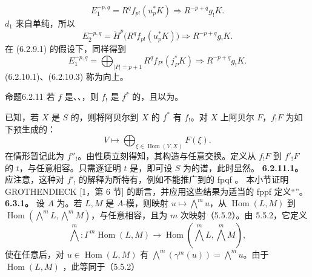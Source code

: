 \[E_1^{-p,q}=R^qf_{p!}(u_p^*K)\Longrightarrow R^{-p+q}g_!K.\tag{6.2.10.1}\]
 $d_1$ 来自单纯，所以
\[E_2^{-p,q}=\check H^p\bigl(R^qf_{p!}(u_p^*K)\bigr)\Longrightarrow R^{-p+q}g_!K.\tag{6.2.10.2}\]
在 (6.2.9.1) 的假设下，同样得到
\[E_1^{-p,q}=\bigoplus_{|P|=p+1}R^qf_{P!}(j_P^*K)\Longrightarrow R^{-p+q}g_!K.\tag{6.2.10.3}\]
 (6.2.10.1)、(6.2.10.3) 称为向上。
\begin{SGAresult}{命题}{6.2.11}
若 $f$ 是、、，则 $f_!$ 是 $f^*$ 的，且以为。
\end{SGAresult}
已知，若 $X$ 是 $S$ 的，则将阿贝尔到 $X$ 的 $f^*$ 有 $f_!$。对 $X$ 上阿贝尔 $F$，$f_!F$ 为如下预生成的：
\[V\longmapsto\bigoplus_{\xi\in\operatorname{Hom}(V,X)}F(\xi).\]
在情形暂记此为 $f''_!$。由性质立刻得知，其构造与任意交换。定义从 $f_!F$ 到 $f'_!F$ 的 $t$，与任意相容。只需逐证明 $t$ 是，即可设 $S$ 为的谱，此时显然。
\textbf{6.2.11.1。} 应注意，这种对 $f'_!$ 的解释为所特有，例如不能推广到的 fpqf 。
本小节证明 GROTHENDIECK [1，第 6 节] 的断言，并应用这些结果为适当的 fppf 定义“”。
\textbf{6.3.1。} 设 $A$ 为。若 $L,M$ 是 $A$-模，则映射 $u\mapsto\bigwedge^m u$，从 $\operatorname{Hom}(L,M)$ 到 $\operatorname{Hom}(\bigwedge^mL,\bigwedge^mM)$，与任意相容，且为 $m$ 次映射（5.5.2）。由 5.5.2，它定义
\[\bigwedge^m:\Gamma^m\operatorname{Hom}(L,M)\longrightarrow\operatorname{Hom}(\bigwedge^mL,\bigwedge^mM),\tag{6.3.1.1}\]
使在任意后，对 $u\in\operatorname{Hom}(L,M)$ 有 $\bigwedge^m(\gamma^m(u))=\bigwedge^m u$。由于 $\operatorname{Hom}(L,M)$ ，此等同于（5.5.2）
